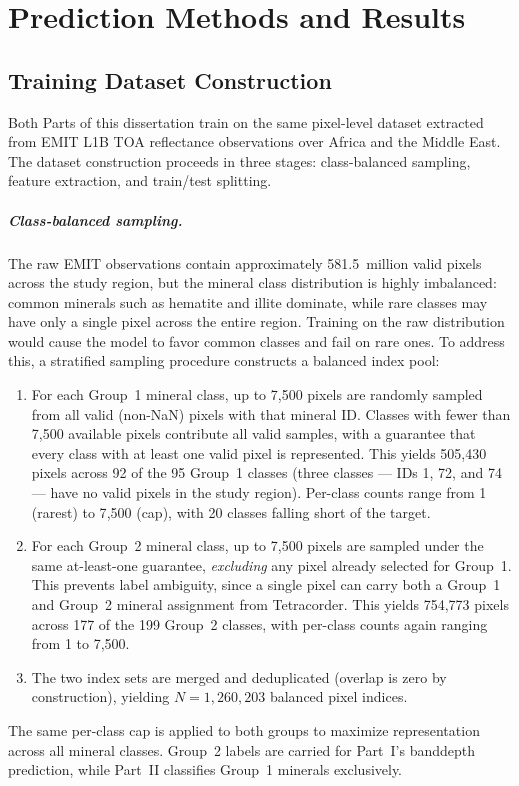 \documentclass[11pt]{report}
\begin{document}
\chapter{Prediction Methods and Results}
\label{chap:part1_results}

\section{Training Dataset Construction}
\label{sec:training_data}

Both Parts of this dissertation train on the same pixel-level dataset extracted from EMIT L1B TOA reflectance observations over Africa and the Middle East. The dataset construction proceeds in three stages: class-balanced sampling, feature extraction, and train/test splitting.

\paragraph{Class-balanced sampling.}
The raw EMIT observations contain approximately 581.5~million valid pixels across the study region, but the mineral class distribution is highly imbalanced: common minerals such as hematite and illite dominate, while rare classes may have only a single pixel across the entire region. Training on the raw distribution would cause the model to favor common classes and fail on rare ones. To address this, a stratified sampling procedure constructs a balanced index pool:
\begin{enumerate}[nosep]
  \item For each Group~1 mineral class, up to 7{,}500 pixels are randomly sampled from all valid (non-NaN) pixels with that mineral ID. Classes with fewer than 7{,}500 available pixels contribute all valid samples, with a guarantee that every class with at least one valid pixel is represented. This yields 505{,}430 pixels across 92 of the 95 Group~1 classes (three classes --- IDs 1, 72, and 74 --- have no valid pixels in the study region). Per-class counts range from 1 (rarest) to 7{,}500 (cap), with 20 classes falling short of the target.
  \item For each Group~2 mineral class, up to 7{,}500 pixels are sampled under the same at-least-one guarantee, \emph{excluding} any pixel already selected for Group~1. This prevents label ambiguity, since a single pixel can carry both a Group~1 and Group~2 mineral assignment from Tetracorder. This yields 754{,}773 pixels across 177 of the 199 Group~2 classes, with per-class counts again ranging from 1 to 7{,}500.
  \item The two index sets are merged and deduplicated (overlap is zero by construction), yielding $N = 1{,}260{,}203$ balanced pixel indices.
\end{enumerate}
The same per-class cap is applied to both groups to maximize representation across all mineral classes. Group~2 labels are carried for Part~I's banddepth prediction, while Part~II classifies Group~1 minerals exclusively.
\end{document}
